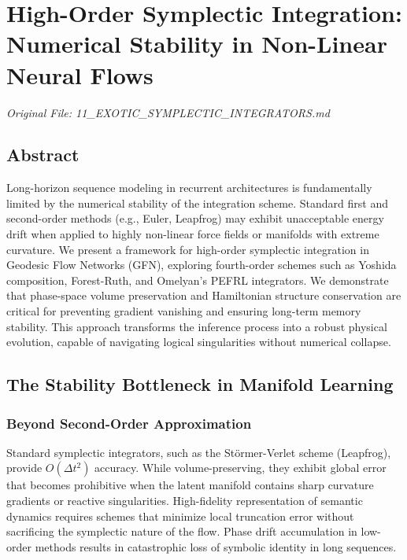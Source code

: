 \documentclass[11pt,a4paper]{report}
\begin{document}
\chapter{High-Order Symplectic Integration: Numerical Stability in Non-Linear Neural Flows}
\textit{Original File: 11\_EXOTIC\_SYMPLECTIC\_INTEGRATORS.md}

\section{Abstract}
Long-horizon sequence modeling in recurrent architectures is fundamentally limited by the numerical stability of the integration scheme. Standard first and second-order methods (e.g., Euler, Leapfrog) may exhibit unacceptable energy drift when applied to highly non-linear force fields or manifolds with extreme curvature. We present a framework for high-order symplectic integration in Geodesic Flow Networks (GFN), exploring fourth-order schemes such as Yoshida composition, Forest-Ruth, and Omelyan's PEFRL integrators. We demonstrate that phase-space volume preservation and Hamiltonian structure conservation are critical for preventing gradient vanishing and ensuring long-term memory stability. This approach transforms the inference process into a robust physical evolution, capable of navigating logical singularities without numerical collapse.

\section{The Stability Bottleneck in Manifold Learning}

\subsection{Beyond Second-Order Approximation}
Standard symplectic integrators, such as the Störmer-Verlet scheme (Leapfrog), provide $O(\Delta t^2)$ accuracy. While volume-preserving, they exhibit global error that becomes prohibitive when the latent manifold contains sharp curvature gradients or reactive singularities. High-fidelity representation of semantic dynamics requires schemes that minimize local truncation error without sacrificing the symplectic nature of the flow. Phase drift accumulation in low-order methods results in catastrophic loss of symbolic identity in long sequences.
\end{document}
